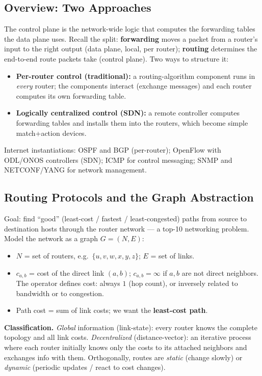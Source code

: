\documentclass[hidelinks]{article}
\begin{document}
\subsection{Overview: Two Approaches}

The control plane is the network-wide logic that computes the forwarding
tables the data plane uses. Recall the split: \textbf{forwarding} moves a
packet from a router's input to the right output (data plane, local, per
router); \textbf{routing} determines the end-to-end route packets take
(control plane). Two ways to structure it:
\begin{itemize}
    \item \textbf{Per-router control (traditional):} a routing-algorithm
    component runs in \emph{every} router; the components interact (exchange
    messages) and each router computes its own forwarding table.
    \item \textbf{Logically centralized control (SDN):} a remote controller
    computes forwarding tables and installs them into the routers, which
    become simple match+action devices.
\end{itemize}
Internet instantiations: OSPF and BGP (per-router); OpenFlow with ODL/ONOS
controllers (SDN); ICMP for control messaging; SNMP and NETCONF/YANG for
network management.

\subsection{Routing Protocols and the Graph Abstraction}

Goal: find ``good'' (least-cost / fastest / least-congested) paths from source
to destination hosts through the router network --- a top-10 networking
problem. Model the network as a graph $G=(N,E)$:
\begin{itemize}
    \item $N$ = set of routers, e.g.\ $\{u,v,w,x,y,z\}$; $E$ = set of links.
    \item $c_{a,b}$ = cost of the direct link $(a,b)$; $c_{a,b}=\infty$ if
    $a,b$ are not direct neighbors. The operator defines cost: always $1$ (hop
    count), or inversely related to bandwidth or to congestion.
    \item Path cost = sum of link costs; we want the \textbf{least-cost path}.
\end{itemize}
\textbf{Classification.} \emph{Global} information (link-state): every router
knows the complete topology and all link costs. \emph{Decentralized}
(distance-vector): an iterative process where each router initially knows only
the costs to its attached neighbors and exchanges info with them. Orthogonally,
routes are \emph{static} (change slowly) or \emph{dynamic} (periodic updates /
react to cost changes).
\end{document}
